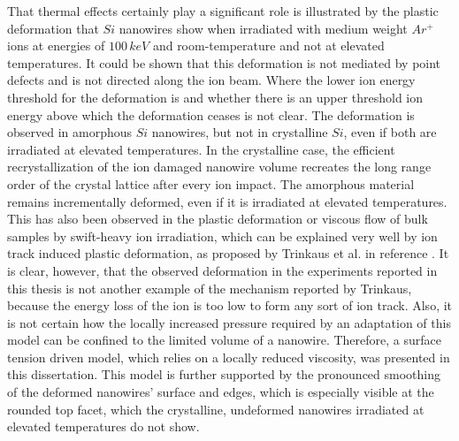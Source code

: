 That thermal effects certainly play a significant role is illustrated by the plastic deformation that $Si$ nanowires show when irradiated with medium weight $Ar^+$ ions at energies of $100\,keV$ and room-temperature and not at elevated temperatures. It could be shown that this deformation is not mediated by point defects and is not directed along the ion beam. Where the lower ion energy threshold for the deformation is and whether there is an upper threshold ion energy above which the deformation ceases is not clear. The deformation is observed in amorphous $Si$ nanowires, but not in crystalline $Si$, even if both are irradiated at elevated temperatures. In the crystalline case, the efficient recrystallization of the ion damaged nanowire volume recreates the long range order of the crystal lattice after every ion impact. The amorphous material remains incrementally deformed, even if it is irradiated at elevated temperatures. This has also been observed in the plastic deformation or viscous flow of bulk samples by swift-heavy ion irradiation, which can be explained very well by ion track induced plastic deformation, as proposed by Trinkaus et al. in reference \cite{trinkaus_viscoelastic_1995}. It is clear, however, that the observed deformation in the experiments reported in this thesis is not another example of the mechanism reported by Trinkaus, because the energy loss of the ion is too low to form any sort of ion track. Also, it is not certain how the locally increased pressure required by an adaptation of this model can be confined to the limited volume of a nanowire. Therefore, a surface tension driven model, which relies on a locally reduced viscosity, was presented in this dissertation. This model is further supported by the pronounced smoothing of the deformed nanowires' surface and edges, which is especially visible at the rounded top facet, which the crystalline, undeformed nanowires irradiated at elevated temperatures do not show.

